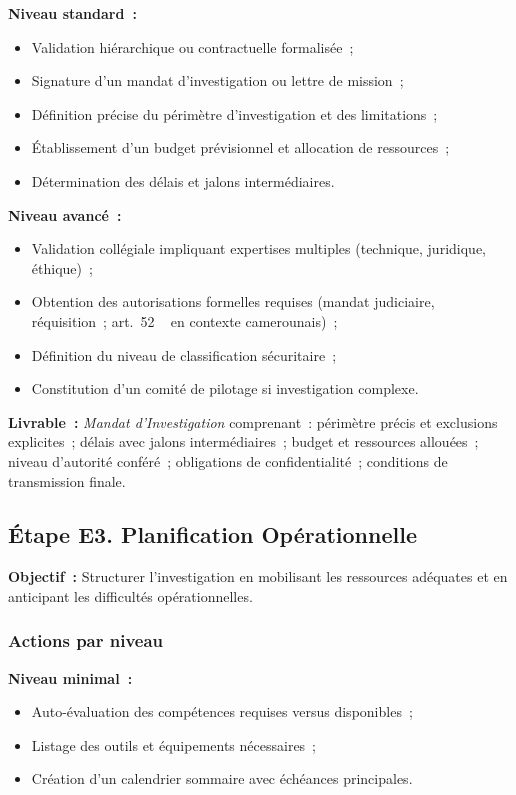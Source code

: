 \textbf{Niveau standard~:}
\begin{itemize}
    \item Validation hiérarchique ou contractuelle formalisée~;
    \item Signature d'un mandat d'investigation ou lettre de mission~;
    \item Définition précise du périmètre d'investigation et des limitations~;
    \item Établissement d'un budget prévisionnel et allocation de ressources~;
    \item Détermination des délais et jalons intermédiaires.
\end{itemize}

\textbf{Niveau avancé~:}
\begin{itemize}
    \item Validation collégiale impliquant expertises multiples (technique,
          juridique, éthique)~;
    \item Obtention des autorisations formelles requises (mandat judiciaire,
          réquisition~; art.~52 ~\cite{cameroun2010a} en contexte camerounais)~;
    \item Définition du niveau de classification sécuritaire~;
    \item Constitution d'un comité de pilotage si investigation complexe.
\end{itemize}

\textbf{Livrable~:} \textit{Mandat d'Investigation} comprenant~: périmètre précis
et exclusions explicites~; délais avec jalons intermédiaires~; budget et
ressources allouées~; niveau d'autorité conféré~; obligations de confidentialité~;
conditions de transmission finale.

\subsection{Étape E3. Planification Opérationnelle}

\textbf{Objectif~:} Structurer l'investigation en mobilisant les ressources
adéquates et en anticipant les difficultés opérationnelles.

\subsubsection*{Actions par niveau}

\textbf{Niveau minimal~:}
\begin{itemize}
    \item Auto-évaluation des compétences requises versus disponibles~;
    \item Listage des outils et équipements nécessaires~;
    \item Création d'un calendrier sommaire avec échéances principales.
\end{itemize}

